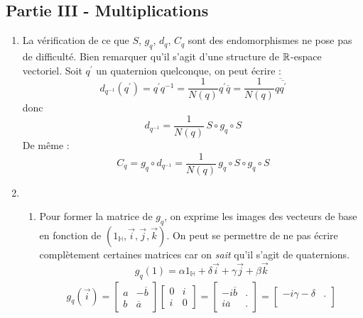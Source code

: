\subsection*{Partie III - Multiplications}
\begin{enumerate}
 \item La vérification de ce que $S$, $g_q$, $d_q$, $C_q$ sont des endomorphismes ne pose pas de difficulté. Bien remarquer qu'il s'agit d'une structure de $\mathbb{R}$-espace vectoriel.\newline
Soit $q^\prime$ un quaternion quelconque, on peut écrire :
\begin{equation*}
 d_{q^{-1}}(q^\prime) = q^\prime q^{-1} = \dfrac{1}{N(q)}q^\prime \overline{q} = \dfrac{1}{N(q)}\overline{q\overline{q^\prime}}
\end{equation*}
donc
\begin{displaymath}
 d_{q^{-1}} = \dfrac{1}{N(q)} \,S \circ g_q \circ S
\end{displaymath}
De même :
\begin{displaymath}
 C_q=g_q \circ d_{q^{-1}}= \dfrac{1}{N(q)} \,g_q \circ S \circ g_q \circ S
\end{displaymath}
\item \begin{enumerate}
 \item Pour former la matrice de $g_q$, on exprime les images des vecteurs de base en fonction de $(1_{\mathbb{H}},\overrightarrow{i},\overrightarrow{j},\overrightarrow{k})$. On peut se permettre de ne pas écrire complètement certaines matrices car on \emph{sait} qu'il s'agit de quaternions.
\begin{displaymath}
 g_q(1)= \alpha 1_{\mathbb{H}} + \delta \overrightarrow{i} + \gamma \overrightarrow{j} + \beta \overrightarrow{k}
\end{displaymath}
\begin{multline*}
 g_q(\overrightarrow{i}) = 
 \begin{bmatrix}
a  & -\overline{b} \\
b  & \overline{a}
\end{bmatrix}
\begin{bmatrix}
0  & i \\
i  & 0 
\end{bmatrix}
=
\begin{bmatrix}
 -i\overline{b} & . \\
 i\overline{a} &  .
\end{bmatrix}
=
\begin{bmatrix}
 -i\gamma -\delta & . \\

\end{bmatrix}
\end{multline*}
\end{enumerate}
\end{enumerate}
